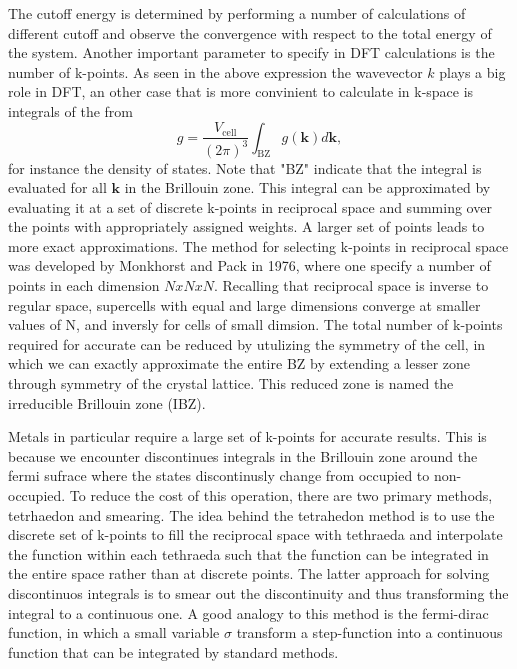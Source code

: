 The cutoff energy is determined by performing a number of calculations of different cutoff and observe the convergence with respect to the total energy of the system. Another important parameter to specify in DFT calculations is the number of k-points. As seen in the above expression the wavevector $k$ plays a big role in DFT, an other case that is more convinient to calculate in k-space is integrals of the from 
\begin{equation}
    g = \frac{V_{\text{cell}}}{(2\pi)^3} \int_{\text{BZ}} g(\boldsymbol{k})d\boldsymbol{k},
\end{equation}
for instance the density of states. Note that "BZ" indicate that the integral is evaluated for all $\boldsymbol{k}$ in the Brillouin zone. This integral can be approximated by evaluating it at a set of discrete k-points in reciprocal space and summing over the points with appropriately assigned weights. A larger set of points leads to more exact approximations. The method for selecting k-points in reciprocal space was developed by Monkhorst and Pack in 1976, where one specify a number of points in each dimension $N x N x N$. Recalling that reciprocal space is inverse to regular space, supercells with equal and large dimensions converge at smaller values of N, and inversly for cells of small dimsion. The total number of k-points required for accurate can be reduced by utulizing the symmetry of the cell, in which we can exactly approximate the entire BZ by extending a lesser zone through symmetry of the crystal lattice. This reduced zone is named the irreducible Brillouin zone (IBZ). 

Metals in particular require a large set of k-points for accurate results. This is because we encounter discontinues integrals in the Brillouin zone around the fermi sufrace where the states discontinusly change from occupied to non-occupied. To reduce the cost of this operation, there are two primary methods, tetrhaedon and smearing. The idea behind the tetrahedon method is to use the discrete set of k-points to fill the reciprocal space with tethraeda and interpolate the function within each tethraeda such that the function can be integrated in the entire space rather than at discrete points. The latter approach for solving discontinuos integrals is to smear out the discontinuity and thus transforming the integral to a continuous one. A good analogy to this method is the fermi-dirac function, in which a small variable $\sigma$ transform a step-function into a continuous function that can be integrated by standard methods.

